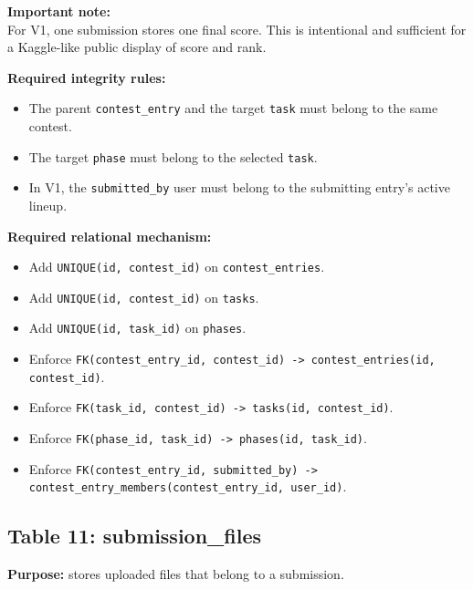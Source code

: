 \documentclass[11pt,a4paper]{article}
\begin{document}
\textbf{Important note:}\\
For V1, one submission stores one final score. This is intentional and sufficient for a Kaggle-like public display of score and rank.

\textbf{Required integrity rules:}
\begin{itemize}
    \item The parent \texttt{contest\_entry} and the target \texttt{task} must belong to the same contest.
    \item The target \texttt{phase} must belong to the selected \texttt{task}.
    \item In V1, the \texttt{submitted\_by} user must belong to the submitting entry's active lineup.
\end{itemize}

\textbf{Required relational mechanism:}
\begin{itemize}
    \item Add \texttt{UNIQUE(id, contest\_id)} on \texttt{contest\_entries}.
    \item Add \texttt{UNIQUE(id, contest\_id)} on \texttt{tasks}.
    \item Add \texttt{UNIQUE(id, task\_id)} on \texttt{phases}.
    \item Enforce \texttt{FK(contest\_entry\_id, contest\_id) -> contest\_entries(id, contest\_id)}.
    \item Enforce \texttt{FK(task\_id, contest\_id) -> tasks(id, contest\_id)}.
    \item Enforce \texttt{FK(phase\_id, task\_id) -> phases(id, task\_id)}.
    \item Enforce \texttt{FK(contest\_entry\_id, submitted\_by) -> contest\_entry\_members(contest\_entry\_id, user\_id)}.
\end{itemize}

\subsection{Table 11: submission\_files}
\textbf{Purpose:} stores uploaded files that belong to a submission.
\end{document}
